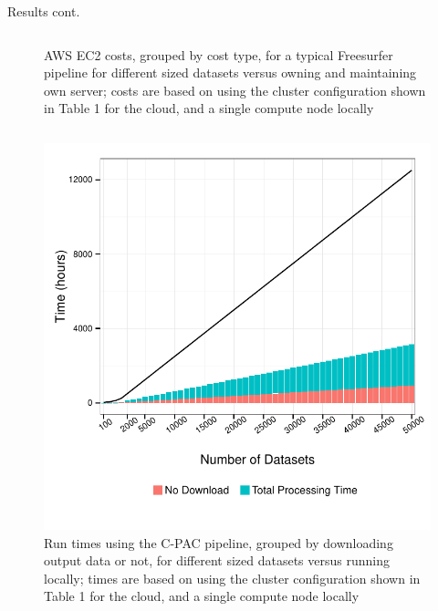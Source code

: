 \documentclass[final,hyperref={pdfpagelabels=false}]{beamer}
\begin{document}
\begin{frame}
\begin{columns}
\begin{column}{.5\textwidth}
{\begin{block}{Results cont.}
\begin{column}{.47\textwidth}
\begin{figure}
                  \caption{\label{fig:fs-costs}AWS EC2 costs, grouped by cost type, for a typical Freesurfer pipeline for different sized datasets versus owning and maintaining own server; costs are based on using the cluster configuration shown in Table 1 for the cloud, and a single compute node locally}
              \end{figure}
              \end{column}
          \begin{column}{.47\textwidth}

              \begin{figure}
                  \includegraphics[width=.99\textwidth]{cpac-times.pdf}
                  \caption{\label{fig:cpac-times}Run times using the C-PAC pipeline, grouped by downloading output data or not, for different sized datasets versus running locally; times are based on using the cluster configuration shown in Table 1 for the cloud, and a single compute node locally}
              \end{figure}
              \begin{figure}

\end{figure}
\end{column}
\end{block}}
\end{column}
\end{columns}
\end{frame}
\end{document}
